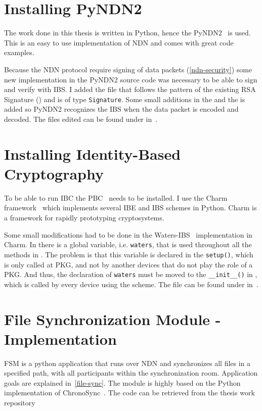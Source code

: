 \section{Installing PyNDN2}
The work done in this thesis is written in Python, hence the \gls{PyNDN2}~\cite{pyndn2-git} is used.
This is an easy to use implementation of \gls{NDN} and comes with great code examples.

Because the \gls{NDN} protocol require signing of \gls{data} packets (\autoref{ndn-security}) some new implementation in the \gls{PyNDN2} source code was necessary to be able to sign and verify with \gls{IBS}.
I added the  file that follows the pattern of the existing RSA Signature () and is of type \texttt{Signature}.
Some small additions in the  and the  is added so \gls{PyNDN2} recognizes the \gls{IBS} when the \gls{data} packet is encoded and decoded.
The files edited can be found under  in~\cite{garseg15}.

\section{Installing Identity-Based Cryptography}
To be able to run \gls{IBC} the \gls{PBC}~\cite{ben2007implementation} needs to be installed.
I use the Charm framework~\cite{charm13} which implements several \gls{IBE} and \gls{IBS} schemes in Python.
Charm is a framework for rapidly prototyping cryptosystems.


Some small modifications had to be done in the Waters-\gls{IBS}~\cite{DBLP:journals/iacr/Waters04} implementation in Charm.
In  there is a global variable, i.e. \texttt{waters}, that is used throughout all the methods in .
The problem is that this variable is declared in the \texttt{setup()}, which is only called at \gls{PKG}, and not by another devices that do not play the role of a \gls{PKG}. 
And thus, the declaration of \texttt{waters} must be moved to the \texttt{\_\_init\_\_()} in , which is called by every device using the scheme.
The file can be found under  in~\cite{garseg15}.

\section{File Synchronization Module - Implementation}
\gls{FSM} is a python application that runs over \gls{NDN} and synchronizes all files in a specified path, with all participants within the synchronization room.
Application goals are explained in~\autoref{file-sync}.
The module is highly based on the Python implementation of ChronoSync~\cite[test-chrono-chat.py]{pyndn2-git}.
The code can be retrieved from the thesis work repository~\cite[fileSync.py]{garseg15}


